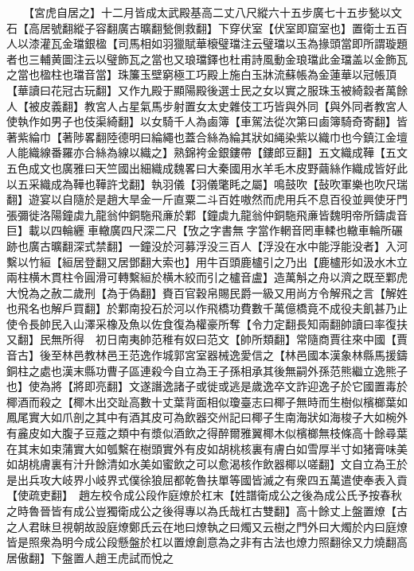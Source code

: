 　　【宮虎自居之】十二月皆成太武殿基高二丈八尺縱六十五步廣七十五步甃以文石【高居號翻縱子容翻廣古曠翻甃側救翻】下穿伏室【伏室即窟室也】置衛士五百人以漆灌瓦金璫銀楹【司馬相如羽獵賦華榱璧璫注云璧璫以玉為掾頭當即所謂璇題者也三輔黄圖注云以璧飾瓦之當也又琅璫鐸也杜甫詩風動金琅璫此金璫盖以金飾瓦之當也楹柱也璫音當】珠簾玉壁窮極工巧殿上施白玉牀流蘇帳為金蓮華以冠帳頂【華讀曰花冠古玩翻】又作九殿于顯陽殿後選士民之女以實之服珠玉被綺縠者萬餘人【被皮義翻】教宮人占星氣馬步射置女太史雜伎工巧皆與外同【與外同者教宮人使執作如男子也伎渠綺翻】以女騎千人為鹵簿【車駕法從次第曰鹵簿騎奇寄翻】皆著紫綸巾【著陟畧翻陸德明曰綸繩也蓋合絲為綸其狀如䋲染紫以織巾也今鎮江金壇人能織線番羅亦合絲為線以織之】熟錦袴金銀鏤帶【鏤郎豆翻】五文織成鞾【五文五色成文也廣雅曰天竺國出細織成魏畧曰大秦國用水羊毛木皮野繭絲作織成皆好此以五采織成為鞾也鞾許戈翻】執羽儀【羽儀氅眊之屬】鳴鼓吹【鼔吹軍樂也吹尺瑞翻】遊宴以自隨於是趙大旱金一斤直粟二斗百姓嗷然而虎用兵不息百役並興使牙門張彌徙洛陽鐘虡九龍翁仲銅駞飛亷於鄴【鐘虡九龍翁仲銅駞飛亷皆魏明帝所鑄虡音巨】載以四輪纒車轍廣四尺深二尺【攷之字書無字當作輞音罔車輮也轍車輪所碾跡也廣古曠翻深式禁翻】一鐘没於河募浮没三百人【浮没在水中能浮能没者】入河繫以竹絙【絙居登翻又居鄧翻大索也】用牛百頭鹿櫨引之乃出【鹿櫨形如汲水木立兩柱横木貫柱令圓滑可轉繫絙於横木絞而引之櫨音盧】造萬斛之舟以濟之既至鄴虎大悅為之赦二歲刑【為于偽翻】賚百官穀帛賜民爵一級又用尚方令解飛之言【解姓也飛名也解戶買翻】於鄴南投石於河以作飛橋功費數千萬億橋竟不成役夫飢甚乃止使令長帥民入山澤采橡及魚以佐食復為權豪所奪【令力定翻長知兩翻帥讀曰率復扶又翻】民無所得　初日南夷帥范稚有奴曰范文【帥所類翻】常隨商賈往來中國【賈音古】後至林邑教林邑王范逸作城郭宮室器械逸愛信之【林邑國本漢象林縣馬援鑄銅柱之處也漢末縣功曹子區連殺今自立為王子孫相承其後無嗣外孫范熊繼立逸熊子也】使為將【將即亮翻】文遂譖逸諸子或徙或逃是歲逸卒文詐迎逸子於它國置毒於椰酒而殺之【椰木出交趾高數十丈葉背面相似瓊臺志曰椰子無時而生樹似檳榔葉如鳳尾實大如爪剖之其中有酒其皮可為飲器交州記曰椰子生南海狀如海梭子大如椀外有麄皮如大腹子豆蔻之類中有漿似酒飲之得醉爾雅翼椰木似檳榔無枝條高十餘尋葉在其末如束蒲實大如瓠繫在樹頭實外有皮如胡桃核裏有膚白如雪厚半寸如猪膏味美如胡桃膚裏有汁升餘清如水美如蜜飲之可以愈渴核作飲器椰以嗟翻】文自立為王於是出兵攻大岐界小岐界式僕徐狼屈都乾魯扶單等國皆滅之有衆四五萬遣使奉表入貢【使疏吏翻】　趙左校令成公段作庭燎於杠末【姓譜衛成公之後為成公氏予按春秋之時魯晉皆有成公豈獨衛成公之後得專以為氏哉杠古雙翻】高十餘丈上盤置燎【古之人君昧旦視朝故設庭燎鄭氏云在地曰燎執之曰燭又云樹之門外曰大燭於内曰庭燎皆是照衆為明今成公段懸盤於杠以置燎創意為之非有古法也燎力照翻徐又力燒翻高居傲翻】下盤置人趙王虎試而悅之

